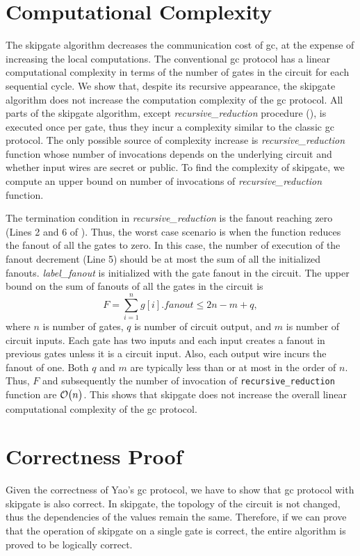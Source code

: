 \section{Computational Complexity}\label{sec:skipgate-complex}
The \gls{skipgate} algorithm decreases the communication cost of \acrshort{gc}, at the expense of increasing the local computations.
The conventional \acrshort{gc} protocol has a linear computational complexity in terms of the number of gates in the circuit for each sequential cycle.
We show that, despite its recursive appearance, the \gls{skipgate} algorithm does not increase the computation complexity of the \acrshort{gc} protocol.
All parts of the \gls{skipgate} algorithm, except \textit{recursive\_reduction} procedure (), is executed once per gate, thus they incur a complexity similar to the classic \acrshort{gc} protocol.
The only possible source of complexity increase is \textit{recursive\_reduction} function whose number of invocations depends on the underlying circuit and whether input wires are secret or public.
To find the complexity of \gls{skipgate}, we compute an upper bound on number of invocations of \textit{recursive\_reduction} function.

The termination condition in \textit{recursive\_reduction} is the fanout reaching zero (Lines 2 and 6 of ).
Thus, the worst case scenario is when the function reduces the fanout of all the gates to zero.
In this case, the number of execution of the fanout decrement (Line 5) should be at most the sum of all the initialized fanouts.
\textit{label\_fanout} is initialized with the gate fanout in the circuit.
The upper bound on the sum of fanouts of all the gates in the circuit is $$F = \sum_{i=1}^{n} g[i].fanout \le 2n - m + q,$$ where $n$ is number of gates, $q$ is number of circuit output, and $m$ is number of circuit inputs.
Each gate has two inputs and each input creates a fanout in previous gates unless it is a circuit input.
Also, each output wire incurs the fanout of one.
Both $q$ and $m$ are typically less than or at most in the order of $n$.
Thus, $F$ and subsequently the number of invocation of \texttt{recursive\_reduction} function are $\mathcal{O}\bigl(n\bigr)$.
This shows that \gls{skipgate} does not increase the overall linear computational complexity of the \acrshort{gc} protocol.

\section{Correctness Proof}\label{sec:skipgate-correct}
Given the correctness of Yao's \acrshort{gc} protocol, we have to show that \acrshort{gc} protocol with \gls{skipgate} is also correct.
In \gls{skipgate}, the topology of the circuit is not changed, thus the dependencies of the values remain the same.
Therefore, if we can prove that the operation of \gls{skipgate} on a single gate is correct, the entire algorithm is proved to be logically correct.

